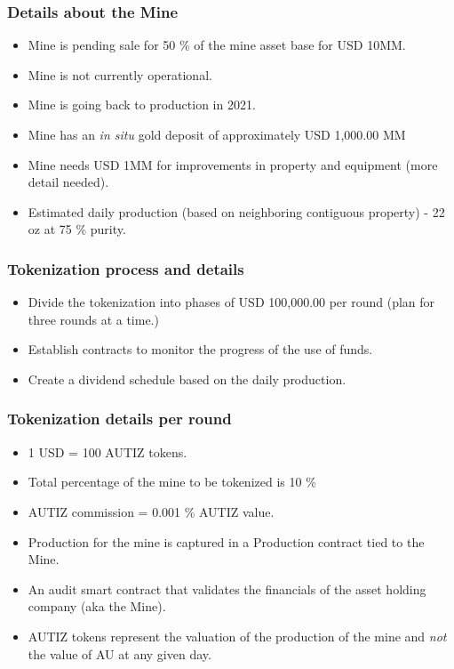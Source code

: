\documentclass{beamer}
\begin{document}
\begin{frame}
\frametitle{Details about the Mine}
\begin{minipage}{\textwidth}
  \begin{itemize}
    \item  Mine is pending sale for 50 \% of the mine asset base for USD 10MM.
    \item  Mine is not currently operational.
    \item  Mine is going back to production in 2021.
    \item  Mine has an \textit{in situ} gold deposit of approximately USD 1,000.00 MM
    \item  Mine needs USD 1MM for improvements in property and equipment (more detail needed).
    \item  Estimated daily production (based on neighboring contiguous property) - 22 oz at 75 \% purity.
  \end{itemize}
\end{minipage}
\end{frame}

\begin{frame}
\frametitle{Tokenization process and details}
\begin{minipage}{\textwidth}
  \begin{itemize}
    \item  Divide the tokenization into phases of USD 100,000.00 per round (plan for three rounds at a time.)
    \item  Establish contracts to monitor the progress of the use of funds.
    \item  Create a dividend schedule based on the daily production.
  \end{itemize}
  \end{minipage}
\end{frame}

\begin{frame}
\frametitle {Tokenization details per round}
\begin{minipage}{\textwidth}
  \begin{itemize}
    \item  1 USD = 100 AUTIZ tokens.
    \item  Total percentage of the mine to be tokenized is 10 \%
    \item  AUTIZ commission = 0.001 \% AUTIZ value.
    \item  Production for the mine is captured in a Production contract tied to the Mine.
    \item  An audit smart contract that validates the financials of the asset holding company (aka the Mine).
    \item  AUTIZ tokens represent the valuation of the production of the mine and \textit{not} the value of AU at any given day.
  \end{itemize}
  \end{minipage}
\end{frame}
\end{document}
